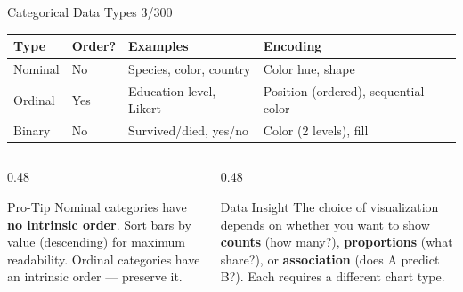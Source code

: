 \documentclass[10pt]{beamer}
\newcommand{\smark}[1]{\hfill{\scriptsize\color{codegray}#1}}
\begin{document}
\begin{frame}{Categorical Data Types}
\smark{3/300}
\centering\small
\begin{tabular}{@{}llll@{}}
    \toprule
    \textbf{Type} & \textbf{Order?} & \textbf{Examples} & \textbf{Encoding} \\
    \midrule
    Nominal   & No  & Species, color, country     & Color hue, shape \\
    Ordinal   & Yes & Education level, Likert      & Position (ordered), sequential color \\
    Binary    & No  & Survived/died, yes/no        & Color (2 levels), fill \\
    \bottomrule
\end{tabular}

\vspace{0.3cm}
\begin{columns}[T]
\begin{column}{0.48\textwidth}
\begin{alertblock}{Pro-Tip}
    \scriptsize Nominal categories have \textbf{no intrinsic order}. Sort bars by value (descending) for maximum readability. Ordinal categories have an intrinsic order --- preserve it.
\end{alertblock}
\end{column}
\begin{column}{0.48\textwidth}
\begin{exampleblock}{Data Insight}
    \scriptsize The choice of visualization depends on whether you want to show \textbf{counts} (how many?), \textbf{proportions} (what share?), or \textbf{association} (does A predict B?). Each requires a different chart type.
\end{exampleblock}
\end{column}
\end{columns}
\end{frame}
\end{document}
